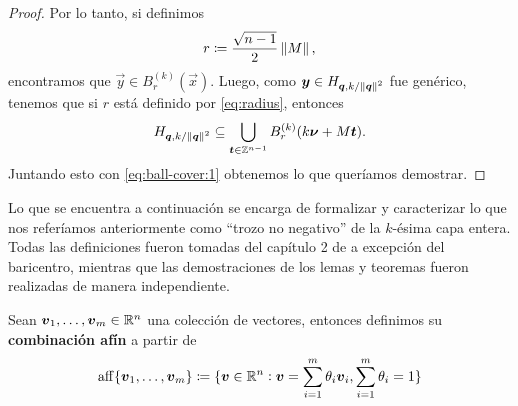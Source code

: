 \begin{proof}
	Por lo tanto, si definimos
	\begin{equation}
		\label{eq:radius}
		r \coloneq \frac{\sqrt{n - 1}}{2}\left\lVert M \right\rVert,
	\end{equation}
	encontramos que $\vec{y} \in B_r^{(k)}(\vec{x})$. Luego, como $\boldsymbol{y} \in H_{\boldsymbol{\boldsymbol{q}}, k/\left\lVert \boldsymbol{\boldsymbol{q}} \right\rVert^{2}}$
	fue genérico, tenemos que si $r$ está definido por \eqref{eq:radius},
	entonces
	\begin{equation}
		\label{eq:ball-cover:2}
		H_{\boldsymbol{\boldsymbol{q}}, k/\left\lVert \boldsymbol{\boldsymbol{q}} \right\rVert^{2}} \subseteq
		\bigcup_{\boldsymbol{t} \in \mathbb{Z}^{n-1}}B_r^{(k)}(k\boldsymbol{\nu} + M\boldsymbol{t}).
	\end{equation}
	Juntando esto con \eqref{eq:ball-cover:1} obtenemos lo que queríamos demostrar.
\end{proof}

Lo que se encuentra a continuación se encarga de formalizar y caracterizar lo
que nos referíamos anteriormente como ``trozo no negativo'' de la $k$-ésima
capa entera. Todas las definiciones fueron tomadas del capítulo 2 de
\cite{boyd} a excepción del baricentro, mientras que las demostraciones de los
lemas y teoremas fueron realizadas de manera independiente.
\begin{definition}
	\label{def:aff}
	Sean $\boldsymbol{v}_1, \ldots, \boldsymbol{v}_m \in \mathbb{R}^n$ una colección de vectores,
	entonces definimos su \textbf{combinación afín} a partir de
	\begin{equation*}
		\operatorname{aff}\lbrace \boldsymbol{v}_1, \ldots, \boldsymbol{v}_m \rbrace \coloneq \lbrace \boldsymbol{v} \in \mathbb{R}^n \vcentcolon \boldsymbol{v} =
		\sum_{i=1}^{m}\theta_i\boldsymbol{v}_i, \sum_{i=1}^{m}\theta_i = 1 \rbrace
	\end{equation*}
\end{definition}

